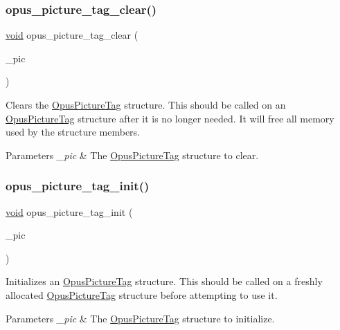 \subsubsection{\texorpdfstring{opus\+\_\+picture\+\_\+tag\+\_\+clear()}{opus\_picture\_tag\_clear()}}
{\footnotesize\ttfamily \hyperlink{png_8h_ac9c84fa68bbad002983e35ce3663c686}{void} opus\+\_\+picture\+\_\+tag\+\_\+clear (\begin{DoxyParamCaption}\item[{\hyperlink{struct_opus_picture_tag}{Opus\+Picture\+Tag} $\ast$}]{\+\_\+pic }\end{DoxyParamCaption})}

Clears the \hyperlink{struct_opus_picture_tag}{Opus\+Picture\+Tag} structure. This should be called on an \hyperlink{struct_opus_picture_tag}{Opus\+Picture\+Tag} structure after it is no longer needed. It will free all memory used by the structure members. 
\begin{DoxyParams}{Parameters}
{\em \+\_\+pic} & The \hyperlink{struct_opus_picture_tag}{Opus\+Picture\+Tag} structure to clear. \\
\hline
\end{DoxyParams}
\mbox{\label{group__header__info_ga09b9724bb7a9abd1d78680bd7d420ec2}} 
\subsubsection{\texorpdfstring{opus\+\_\+picture\+\_\+tag\+\_\+init()}{opus\_picture\_tag\_init()}}
{\footnotesize\ttfamily \hyperlink{png_8h_ac9c84fa68bbad002983e35ce3663c686}{void} opus\+\_\+picture\+\_\+tag\+\_\+init (\begin{DoxyParamCaption}\item[{\hyperlink{struct_opus_picture_tag}{Opus\+Picture\+Tag} $\ast$}]{\+\_\+pic }\end{DoxyParamCaption})}

Initializes an \hyperlink{struct_opus_picture_tag}{Opus\+Picture\+Tag} structure. This should be called on a freshly allocated \hyperlink{struct_opus_picture_tag}{Opus\+Picture\+Tag} structure before attempting to use it. 
\begin{DoxyParams}{Parameters}
{\em \+\_\+pic} & The \hyperlink{struct_opus_picture_tag}{Opus\+Picture\+Tag} structure to initialize. \\
\hline
\end{DoxyParams}
\mbox{\label{group__header__info_ga6487af1d21fe87f4815567d85a27989a}} 
